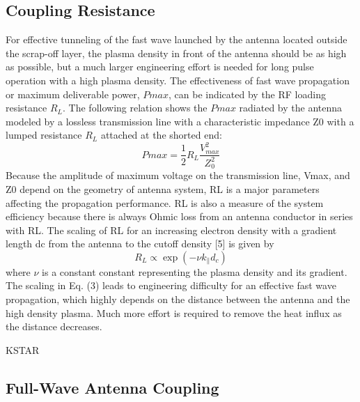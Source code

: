 \subsection{Coupling Resistance}
For effective tunneling of the fast wave launched
by the antenna located outside the scrap-off layer, the
plasma density in front of the antenna should be as high
as possible, but a much larger engineering effort is needed
for long pulse operation with a high plasma density. The
effectiveness of fast wave propagation or maximum deliverable
power, $Pmax$, can be indicated by the RF loading
resistance $R_L$. The following relation shows the $Pmax$ radiated
by the antenna modeled by a lossless transmission
line with a characteristic impedance Z0 with a lumped
resistance $R_L$ attached at the shorted end:
\begin{equation}
	Pmax = \frac{1}{2} R_L \frac{V^2_{max}}{Z_0^2}
\end{equation}
Because the amplitude of maximum voltage on the transmission
line, Vmax, and Z0 depend on the geometry of
antenna system, RL is a major parameters affecting the
propagation performance. RL is also a measure of the
system efficiency because there is always Ohmic loss from
an antenna conductor in series with RL.
The scaling of RL for an increasing electron density
with a gradient length dc from the antenna to the cutoff
density [5] is given by
\begin{equation}
	R_L \propto \exp\left(- \nu k_\parallel d_c \right)
\end{equation}
where $\nu$ is a constant constant representing the plasma density and
its gradient. The scaling in Eq. (3) leads to engineering
difficulty for an effective fast wave propagation, which
highly depends on the distance between the antenna and
the high density plasma. Much more effort is required
to remove the heat influx as the distance decreases.

KSTAR 


\subsection{Full-Wave Antenna Coupling}\label{sec:ICRH_FW_antena_coupling}

